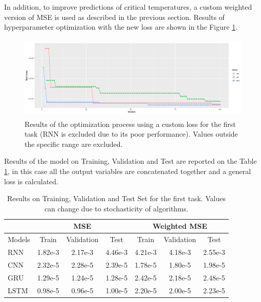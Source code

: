 In addition, to improve predictions of critical temperatures, a custom weighted version of MSE is used as described in the previous section. Results of hyperparameter optimization with the new loss are shown in the Figure \ref{fig:automl_custom}.
\begin{figure}[!h]
    \centering
    \includegraphics[width=\linewidth, height=4cm]{imgs/comparison_MSE_new_loss.png}
    \caption{Results of the optimization process using a custom loss for the first task (RNN is excluded due to its poor performance). Values outside the specific range are excluded.}
    \label{fig:automl_custom}
\end{figure} %

Results of the model on Training, Validation and Test are reported on the Table \ref{tab:first}, in this case all the output variables are concatenated together and a general loss is calculated.
\begin{table}[!h]
  \centering
  \begin{tabular}{|l|c|c|c|c|c|c|}
    \hline
           & \multicolumn{3}{|c|}{MSE}      & \multicolumn{3}{|c|}{Weighted MSE} \\
    \hline
    Models & Train   & Validation & Test    & Train   & Validation & Test \\
    \hline
    RNN    & 1.82e-3 & 2.17e-3    & 4.46e-3 & 4.21e-3 & 4.18e-3    & 2.55e-3\\
    CNN    & 2.32e-5 & 2.28e-5    & 2.39e-5 & 1.78e-5 & 1.80e-5    & 1.98e-5\\
    GRU    & 1.29e-5 & 1.24e-5    & 1.28e-5 & 2.42e-5 & 2.18e-5    & 2.48e-5\\
    LSTM   & 0.98e-5 & 0.96e-5    & 1.00e-5 & 2.20e-5 & 2.00e-5    & 2.23e-5\\
    \hline
  \end{tabular}
  \caption{Results on Training, Validation and Test Set for the first task. Values can change due to stochasticity of algorithms.}
  \label{tab:first}
\end{table}

